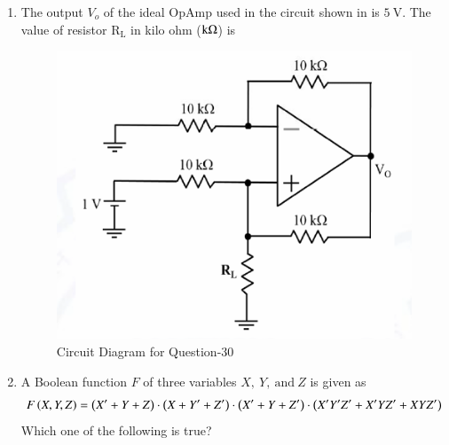 \documentclass[journal,12pt,onecolumn]{IEEEtran}
\theoremstyle{remark}
\begin{document}
\begin{enumerate}
\item The output $V_o$ of the ideal OpAmp used in the circuit shown in  is $5\ \text{V}$.
The value of resistor $\text{R}_\text{L}$ in kilo ohm ($\text{k}\ohm$) is \par \hfill{}
\begin{figure}[H]
    \centering
    \includegraphics[width=0.5\linewidth]{Figs/Q-30.png}
    \caption{Circuit Diagram for Question-30}
    \label{30}
\end{figure}
\begin{enumerate}[label=(\Alph*)]
\end{enumerate}

\item A Boolean function $F$ of three variables $X,\ Y,\ \text{and}\ Z$ is given as  
\[F\left(X, Y, Z\right) = \left(X' + Y + Z\right)\cdot\left(X + Y' + Z'\right)\cdot\left(X' + Y + Z'\right)\cdot
\left(X'Y'Z' + X'YZ' + XYZ'\right)\]  
Which one of the following is true? \par \hfill{}
\begin{enumerate}[label=(\Alph*)]
\end{enumerate}


\end{enumerate}
\end{document}
